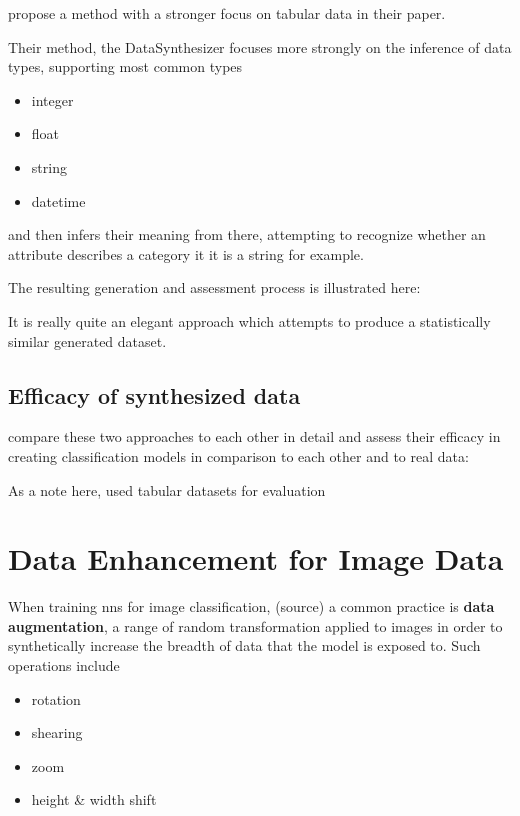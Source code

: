 \cite{ping2017datasynthesizer} propose a method with a stronger focus on tabular data in their paper.

Their method, the DataSynthesizer focuses more strongly on the inference of data types, supporting most common types

\begin{itemize}
	\item integer
	\item float
	\item string
	\item datetime
\end{itemize} 

and then infers their meaning from there, attempting to recognize whether an attribute describes a category it it is a string for example.

\pagebreak

The resulting generation and assessment process is illustrated here:


It is really quite an elegant approach which attempts to produce a statistically similar generated dataset.

\clearpage

\subsection{Efficacy of synthesized data}

\label{subsection:efficacy}

\cite{ares_utility} compare these two approaches to each other in detail and assess their efficacy in creating classification models in comparison to each other and to real data:


As a note here, \cite{ares_utility} used tabular datasets for evaluation 

\pagebreak

\section{Data Enhancement for Image Data}

When training \acp{nn} for image classification, (source) a common practice is \textbf{data augmentation}, a range of random transformation applied to images in order to synthetically increase the breadth of data that the model is exposed to. 
Such operations include 
\begin{itemize}
	\item rotation
	\item shearing
	\item zoom
	\item height \& width shift
\end{itemize}

